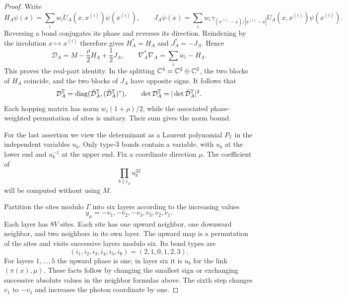 \begin{proof}
Write
\[
 H_A\psi(x)=\sum_iw_iU_A(x,x^{(i)})\psi(x^{(i)}),\qquad
 J_A\psi(x)=\sum_iw_i\gamma_{(x^{(i)}-x)/|x^{(i)}-x|}
                         U_A(x,x^{(i)})\psi(x^{(i)}).
\]
Reversing a bond conjugates its phase and reverses its direction.
Reindexing by the involution $x\mapsto x^{(i)}$ therefore gives
$H_A^*=H_A$ and $J_A^*=-J_A$. Hence
\[
 \mathcal D_A=M-\frac\rho2H_A+\frac12J_A,\qquad
 \nabla_A^*\nabla_A=\sum_iw_i-H_A.
\]
This proves the real-part identity. In the splitting
$\mathbb C^4=\mathbb C^2\oplus\mathbb C^2$, the two blocks of $H_A$ coincide, and the two
blocks of $J_A$ have opposite signs. It follows that
\begin{equation}\label{eq:reg-two-blocks}
 \mathcal D_A^{\mathbb T}=\operatorname{diag}(\check{\mathcal D}_A^{\mathbb T},
                                      (\check{\mathcal D}_A^{\mathbb T})^*),
 \qquad \det \mathcal D_A^{\mathbb T}=|\det\check{\mathcal D}_A^{\mathbb T}|^2.
\end{equation}
Each hopping matrix has norm $w_i(1+\rho)/2$, while the associated
phase-weighted permutation of sites is unitary. Their sum gives the norm bound.

For the last assertion we view the determinant as a Laurent
polynomial $P_{\mathbb T}$ in the independent variables $u_b$.
Only type-$3$ bonds contain a variable, with $u_b$ at the lower end
and $u_b^{-1}$ at the upper end. Fix a coordinate direction $\mu$.
The coefficient of
\begin{equation}\label{eq:reg-extreme-monomial}
 \prod_{b\parallel e_\mu}u_b^{32}
\end{equation}
will be computed without using $M$.

Partition the sites modulo $\Gamma$ into six layers according to
the increasing values
\[
 y_\mu=-v_1,-v_2,-v_3,v_3,v_2,v_1.
\]
Each layer has $8V$ sites. Each site has one upward neighbor,
one downward neighbor, and two neighbors in its own layer. The
upward map is a permutation of the sites and visits successive layers
modulo six. Its bond types are
\begin{equation}\label{eq:reg-upward-types}
 (i_1,i_2,i_3,i_4,i_5,i_6)=(2,1,0,1,2,3).
\end{equation}
For layers $1,\ldots,5$ the upward phase is one; in layer six it is
$u_b$ for the link $(\pi(x),\mu)$. These facts follow by changing the
smallest sign or exchanging successive absolute values in the
neighbor formulas above. The sixth step changes $v_1$ to $-v_1$
and increases the photon coordinate by one.


\end{proof}
